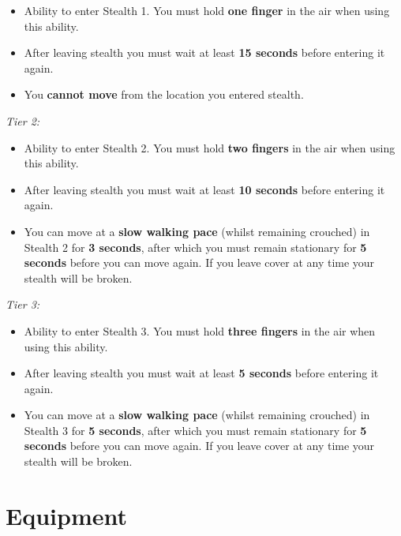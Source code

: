 \begin{itemize}
\item Ability to enter Stealth 1. You must hold \textbf{one finger} in the air when using this ability.

\item After leaving stealth you must wait at least \textbf{15 seconds} before entering it again.

\item You \textbf{cannot move} from the location you entered stealth.

\end{itemize}
\textit{Tier 2:}

\begin{itemize}
\item Ability to enter Stealth 2. You must hold \textbf{two fingers} in the air when using this ability.

\item After leaving stealth you must wait at least \textbf{10 seconds} before entering it again.

\item You can move at a \textbf{slow walking pace} (whilst remaining crouched) in Stealth 2 for \textbf{3 seconds}, after which you must remain stationary for \textbf{5 seconds} before you can move again. If you leave cover at any time your stealth will be broken.

\end{itemize}
\textit{Tier 3:}

\begin{itemize}
\item Ability to enter Stealth 3. You must hold \textbf{three fingers} in the air when using this ability.

\item After leaving stealth you must wait at least \textbf{5 seconds} before entering it again.

\item You can move at a \textbf{slow walking pace} (whilst remaining crouched) in Stealth 3 for \textbf{5 seconds}, after which you must remain stationary for \textbf{5 seconds} before you can move again. If you leave cover at any time your stealth will be broken.

\end{itemize}
\chapter{Equipment}

